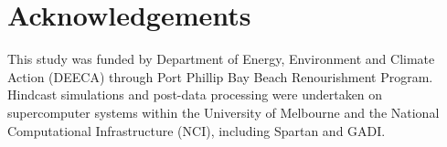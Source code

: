 \documentclass[12pt]{article}
\begin{document}

\newpage
\section*{Acknowledgements}

This study was funded by Department of Energy, Environment and Climate Action (DEECA) through Port Phillip Bay Beach Renourishment Program. Hindcast simulations and post-data processing were undertaken on supercomputer systems within the University of Melbourne and the National Computational Infrastructure (NCI), including Spartan and GADI.

\newpage
\printbibliography

\newpage
\end{document}
